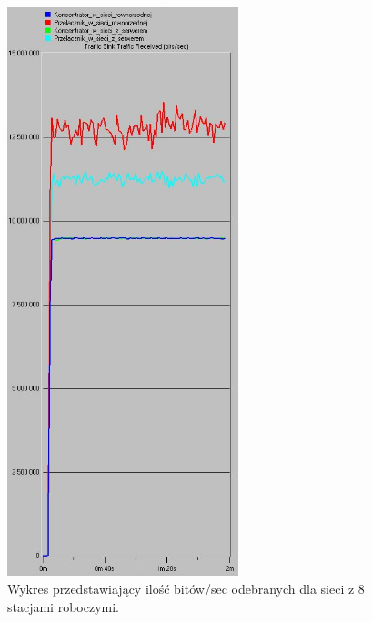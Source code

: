 \documentclass{article}
\begin{document}
\begin{figure}[H]
  \centering
  \includegraphics[width=0.60\textwidth]{screens/8_recv.png}
 \caption{Wykres przedstawiający ilość bitów/sec odebranych dla sieci z 8 stacjami roboczymi.}
 \label{fig:8stacjer}
\end{figure}
\end{document}
